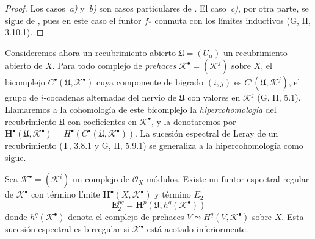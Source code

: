 \begin{proof}
Los casos~\emph{a)} y~\emph{b)} son casos particulares de .
El caso~\emph{c)}, por otra parte, se sigue de , pues en
este caso el funtor $f_*$ conmuta con los límites inductivos
(G, II, 3.10.1).
\end{proof}

\begin{env}[12.4.5]
\label{0.12.4.5-fr}
Consideremos ahora un recubrimiento abierto $\mathfrak U=(U_\alpha)$ un recubrimiento abierto de $X$.
Para todo complejo de \emph{prehaces}
$\mathcal K^\bullet=(\mathcal K^j)$ sobre $X$, el bicomplejo $C^\bullet(\mathfrak U,\mathcal K^\bullet)$ cuya
componente de bigrado $(i,j)$ es
$C^i(\mathfrak U,\mathcal K^j)$, el grupo de
$i$-cocadenas alternadas del nervio de $\mathfrak U$ con valores
en $\mathcal K^j$ (G, II, 5.1).
Llamaremos a la cohomología de este bicomplejo la
\emph{hipercohomología} del recubrimiento $\mathfrak U$ con
coeficientes en $\mathcal K^\bullet$, y la denotaremos por
$\mathbf H^\bullet(\mathfrak U,\mathcal K^\bullet)=H^\bullet(C^\bullet(\mathfrak U,\mathcal K^\bullet))$.
La sucesión espectral de Leray de un recubrimiento
(T, 3.8.1 y G, II, 5.9.1) se generaliza a la hipercohomología como sigue.
\end{env}

\begin{proposition}[12.4.6]
\label{0.12.4.6}
\label{0.12.4.6-fr}
Sea $\mathcal K^\bullet=(\mathcal K^i)$ un complejo de
$\mathcal O_X$-módulos.
Existe un funtor espectral regular de $\mathcal K^\bullet$ con
término límite $\mathbf H^\bullet(X,\mathcal K^\bullet)$ y término $E_2$
\begin{equation}
\label{0.12.4.6.1-fr}
\tag{12.4.6.1}
\mathbf{E}_2^{pq}=\mathbf H^p(\mathfrak U,h^q(\mathcal K^\bullet))
\end{equation}
donde $h^q(\mathcal K^\bullet)$ denota el complejo de prehaces
$V\leadsto H^q(V,\mathcal K^\bullet)$
sobre $X$.
Esta sucesión espectral es birregular si $\mathcal K^\bullet$ está acotado inferiormente.
\end{proposition}

